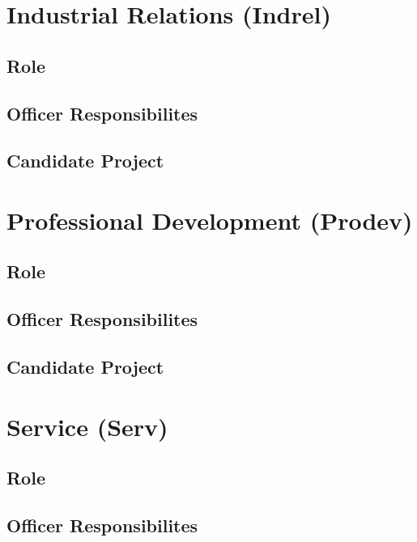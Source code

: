 \documentclass[11pt, article, oneside]{memoir}
\begin{document}
    \bigbreak

    
    \section{Industrial Relations (Indrel)}
    \subsection{Role}

    \subsection{Officer Responsibilites}

    \subsection{Candidate Project}

    \bigbreak

    
    \section{Professional Development (Prodev)}
    \subsection{Role}

    \subsection{Officer Responsibilites}

    \subsection{Candidate Project}


    \bigbreak

    
    \section{Service (Serv)}
    \subsection{Role}

    \subsection{Officer Responsibilites}
\end{document}
